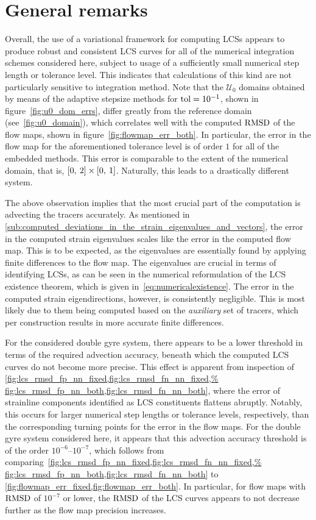 \section{General remarks}
\label{sec:general_remarks}

Overall, the use of a variational framework for computing LCSs appears to
produce robust and consistent LCS curves for all of the numerical integration
schemes considered here, subject to usage of a sufficiently small numerical
step length or tolerance level. This indicates that calculations of this kind
are not particularly sensitive to integration method. Note that the
$\mathcal{U}_{0}$ domains obtained by means of the adaptive stepsize methods
for $\textnormal{tol}=10^{-1}$, shown in figure~\ref{fig:u0_dom_errs}, differ
greatly from the reference domain (see~\cref{fig:u0_domain}), which correlates
well with the computed $\operatorname{RMSD}$ of the flow maps, shown in
figure~\ref{fig:flowmap_err_both}. In particular, the error in the flow map for
the aforementioned tolerance level is of order $1$ for all of the embedded
methods. This error is comparable to the extent of the numerical domain, that
is, $[0,\hspace{0.5ex}2]\times[0,\hspace{0.5ex}1]$. Naturally, this leads to a
drastically different system.

The above observation implies that the most crucial part of the computation is
advecting the tracers accurately. As mentioned in
\cref{sub:computed_deviations_in_the_strain_eigenvalues_and_vectors}, the error
in the computed strain eigenvalues scales like the error in the computed flow
map. This is to be expected, as the eigenvalues are essentially found by
applying finite differences to the flow map. The eigenvalues are crucial in
terms of identifying LCSs, as can be seen in the numerical reformulation of the
LCS existence theorem, which is given in~\cref{eq:numericalexistence}.
The error in the computed strain eigendirections, however, is consistently
negligible. This is most likely due to them being computed based on the %
\emph{auxiliary} set of tracers, which per construction results in more accurate
finite differences.

For the considered double gyre system, there appears to be a lower threshold
in terms of the required advection accuracy, beneath which the computed LCS
curves do not become more precise. This effect is apparent
from inspection of
\cref{fig:lcs_rmsd_fp_nn_fixed,fig:lcs_rmsd_fn_nn_fixed,%
fig:lcs_rmsd_fp_nn_both,fig:lcs_rmsd_fn_nn_both}, where the error of strainline
components identified as LCS constituents flattens abruptly. Notably, this
occurs for larger numerical step lengths or tolerance levels, respectively,
than the corresponding turning points for the error in the flow maps.
For the double gyre system considered here, it appears that this advection
accuracy threshold is of the order $10^{-6}$--$10^{-7}$, which follows from
comparing~\cref{fig:lcs_rmsd_fp_nn_fixed,fig:lcs_rmsd_fn_nn_fixed,%
fig:lcs_rmsd_fp_nn_both,fig:lcs_rmsd_fn_nn_both} to
\cref{fig:flowmap_err_fixed,fig:flowmap_err_both}. In particular, for flow maps
with $\operatorname{RMSD}$ of $10^{-7}$ or lower, the $\operatorname{RMSD}$ of the LCS curves appears to
not decrease further as the flow map precision increases.

